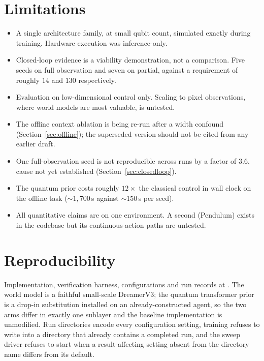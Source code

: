 \documentclass[11pt]{article}
\newif\ifdraft
\newcommand{\pend}[1]{%
  \ifdraft\textcolor{PendFG}{\textbf{[TODO:} \textit{#1}\textbf{]}}\fi}
\begin{document}
\section{Limitations}
\begin{itemize}\itemsep2pt
\item A single architecture family, at small qubit count, simulated
      exactly during training. Hardware execution was inference-only.
\item Closed-loop evidence is a viability demonstration, not a
      comparison. Five seeds on full observation and seven on partial,
      against a requirement of roughly $14$ and $130$ respectively.
\item Evaluation on low-dimensional control only. Scaling to pixel
      observations, where world models are most valuable, is untested.
\item The offline context ablation is being re-run after a width
      confound (Section~\ref{sec:offline}); the superseded version
      should not be cited from any earlier draft.
\item One full-observation seed is not reproducible across runs by a
      factor of $3.6$, cause not yet established
      (Section~\ref{sec:closedloop}).
\item The quantum prior costs roughly $12\times$ the classical control
      in wall clock on the offline task ($\sim\!1{,}700$\,s against
      $\sim\!150$\,s per seed). \pend{give the closed-loop ratio from
      runs known to have run uninterrupted; the earlier figure of
      $5.4\times$ is contaminated by machine sleep}
\item All quantitative claims are on one environment. A second
      (Pendulum) exists in the codebase but its continuous-action paths
      are untested.
\end{itemize}

\section{Reproducibility}
Implementation, verification harness, configurations and run records at
\pend{repository URL and archival DOI}. The world model is a faithful
small-scale DreamerV3; the quantum transformer prior is a drop-in
substitution installed on an already-constructed agent, so the two arms
differ in exactly one sublayer and the baseline implementation is
unmodified. Run directories encode every configuration setting,
training refuses to write into a directory that already contains a
completed run, and the sweep driver refuses to start when a
result-affecting setting absent from the directory name differs from its
default.
\end{document}
